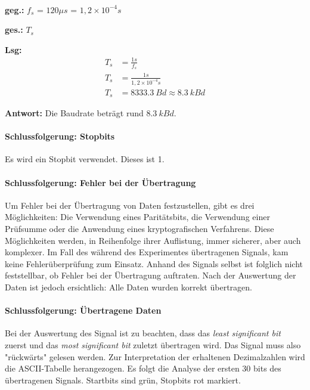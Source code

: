 \mbox{}\\
\noindent
\begin{minipage}{0.5\textwidth}
	\textbf{geg.:} $f_s$ = $120 \mu s$ = $1,2 \times 10^{-4} s$
\end{minipage}%
\begin{minipage}{0.5\textwidth}
	\textbf{ges.:} $T_s$
\end{minipage}

\vspace{0.25cm}

\noindent
\textbf{Lsg:}
\begin{align*}
	T_s &= \frac{1s}{f_s} \\
	T_s &= \frac{1s}{1,2 \times 10^{-4}s} \\
	T_s &= \SI{8333,3}{Bd} \approx \SI{8,3}{kBd}
\end{align*}

\vspace{0.25cm}

\textbf{Antwort:} Die Baudrate beträgt rund $\SI{8,3}{kBd}$.

\paragraph{Schlussfolgerung: Stopbits}
Es wird ein Stopbit verwendet. Dieses ist 1.

\paragraph{Schlussfolgerung: Fehler bei der Übertragung}
Um Fehler bei der Übertragung von Daten festzustellen, gibt es drei Möglichkeiten: Die Verwendung eines Paritätsbits, die Verwendung einer Prüfsumme oder die Anwendung eines kryptografischen Verfahrens. Diese Möglichkeiten werden, in Reihenfolge ihrer Auflistung, immer sicherer, aber auch komplexer. Im Fall des während des Experimentes übertragenen Signals, kam keine Fehlerüberprüfung zum Einsatz. Anhand des Signals selbst ist folglich nicht feststellbar, ob Fehler bei der Übertragung auftraten. Nach der Auswertung der Daten ist jedoch ersichtlich: Alle Daten wurden korrekt übertragen.

\paragraph{Schlussfolgerung: Übertragene Daten}
Bei der Auswertung des Signal ist zu beachten, dass das \textit{least significant bit} zuerst und das \textit{most significant bit} zuletzt übertragen wird. Das Signal muss also "rückwärts" gelesen werden. Zur Interpretation der erhaltenen Dezimalzahlen wird die ASCII-Tabelle herangezogen. Es folgt die Analyse der ersten 30 bits des übertragenen Signals. Startbits sind grün, Stopbits rot markiert.

